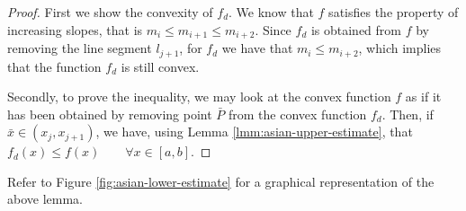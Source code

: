\begin{proof}
	First we show the convexity of $f_d$. We know that $f$ satisfies the property of increasing slopes, that is $ m_{i} \le m_{i+1} \le m_{i+2} $. Since $f_d$ is obtained from $f$ by removing the line segment $l_{j+1}$, for $f_d$ we have that $ m_{i} \le m_{i+2} $, which implies that the function $f_d$ is still convex.
	
	Secondly, to prove the inequality, we may look at the convex function $f$ as if it has been obtained by removing point $ \bar{P} $ from the convex function $f_d$. Then, if $ \bar{x} \in ( x_{j} , x_{j+1} ) $, we have, using Lemma \ref{lmm:asian-upper-estimate}, that $ f_d(x) \le f(x) \qquad \forall x \in [a,b] $.
\end{proof}

Refer to Figure \ref{fig:asian-lower-estimate} for a graphical representation of the above lemma.
